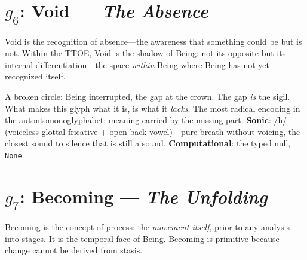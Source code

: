 \documentclass[12pt, letterpaper]{book}
\def\mathfrak#1{#1}%
\begin{document}

\section{$\mathfrak{g}_6$: Void --- \textit{The Absence}}

Void is the recognition of absence---the awareness that something could be but is not. Within the TTOE, Void is the shadow of Being: not its opposite but its internal differentiation---the space \textit{within} Being where Being has not yet recognized itself.

\begin{center}
\end{center}

A broken circle: Being interrupted, the gap at the crown. The gap \textit{is} the sigil. What makes this glyph what it is, is what it \textit{lacks}. The most radical encoding in the autontomonoglyphabet: meaning carried by the missing part. \textbf{Sonic}: /h\textturnscripta/ (voiceless glottal fricative + open back vowel)---pure breath without voicing, the closest sound to silence that is still a sound. \textbf{Computational}: the typed null, \texttt{None}.



\section{$\mathfrak{g}_7$: Becoming --- \textit{The Unfolding}}

Becoming is the concept of process: the \textit{movement itself}, prior to any analysis into stages. It is the temporal face of Being. Becoming is primitive because change cannot be derived from stasis.

\begin{center}
\end{center}
\end{document}
